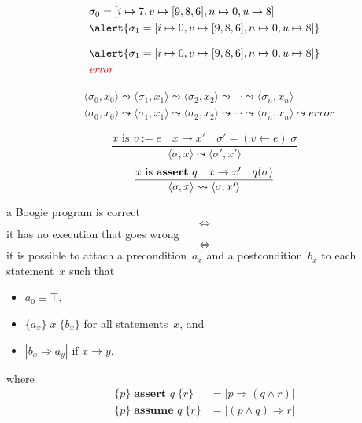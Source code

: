 \documentclass{beamer}
\newcommand{\limp}{\Rightarrow}
\newcommand{\tru}{\top}
\begin{document}
\begin{frame}
\begin{align*}
  &\sigma_0=[i\mapsto7,v\mapsto[9,8,6],n\mapsto0,u\mapsto8]
\\
  &\alert{\sigma_1=[i\mapsto0,v\mapsto[9,8,6],n\mapsto0,u\mapsto8]}
\end{align*}
\begin{center}
\end{center}
\end{frame}

\begin{frame}
\begin{align*}
  &\alert{\sigma_1=[i\mapsto0,v\mapsto[9,8,6],n\mapsto0,u\mapsto8]}
\\
  &\textit{\textcolor{red}{error}}
\end{align*}
\begin{center}
\end{center}
\end{frame}
\begin{frame}
\begin{align*}
  &\langle\sigma_0,x_0\rangle\leadsto
  \langle\sigma_1,x_1\rangle\leadsto
  \langle\sigma_2,x_2\rangle\leadsto
  \cdots\leadsto
  \langle\sigma_n,x_n\rangle
\\
  &\langle\sigma_0,x_0\rangle\leadsto
  \langle\sigma_1,x_1\rangle\leadsto
  \langle\sigma_2,x_2\rangle\leadsto
  \cdots\leadsto
  \langle\sigma_n,x_n\rangle\leadsto
  \mathit{error}
\end{align*}

\pause
$$\frac
  {\text{$x$ is $v:=e$}\quad x\to x'\quad \sigma'=(v\gets e)\;\sigma}
  {\langle\sigma,x\rangle\leadsto\langle\sigma',x'\rangle}$$
$$\frac
  {\text{$x$ is \textbf{assert}~$q$}\quad x\to x'\quad q(\sigma)}
  {\langle\sigma,x\rangle\leadsto\langle\sigma,x'\rangle}$$
\end{frame}

\begin{frame}
a Boogie program is \alert{correct}
$$\iff$$
it has no execution that \alert{goes wrong}
$$\iff$$
it is possible to attach a precondition~$a_x$ and a postcondition~$b_x$
to each statement~$x$ such that
\begin{itemize}
\item $a_0\equiv\tru$,
\item $\{a_x\}\;x\;\{b_x\}$ for all statements~$x$, and
\item $|b_x\limp a_y|$ if $x\to y$.
\end{itemize}

where
\begin{align*}
\{p\}\;\textbf{assert~$q$}\;\{r\} &= \bigl|p\limp(q\land r)\bigr| \\
\{p\}\;\textbf{assume~$q$}\;\{r\} &= \bigl|(p\land q)\limp r\bigr| \\
\end{align*}
\end{frame}
\end{document}
